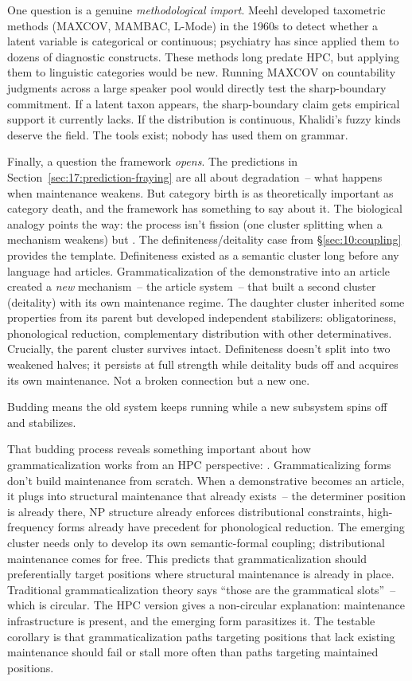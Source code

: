 One question is a genuine \emph{methodological import}. Meehl developed taxometric methods (MAXCOV, MAMBAC, L-Mode) in the 1960s to detect whether a latent variable is categorical or continuous; psychiatry has since applied them to dozens of diagnostic constructs. These methods long predate HPC, but applying them to linguistic categories would be new. Running MAXCOV on countability judgments across a large speaker pool would directly test the sharp-boundary commitment. If a latent taxon appears, the sharp-boundary claim gets empirical support it currently lacks. If the distribution is continuous, Khalidi's fuzzy kinds deserve the field. The tools exist; nobody has used them on grammar.

Finally, a question the framework \emph{opens}. The predictions in Section~\ref{sec:17:prediction-fraying} are all about degradation~-- what happens when maintenance weakens. But category birth is as theoretically important as category death, and the framework has something to say about it. The biological analogy points the way: the process isn't fission (one cluster splitting when a mechanism weakens) but . The definiteness/deitality case from §\ref{sec:10:coupling} provides the template. Definiteness existed as a semantic cluster long before any language had articles. Grammaticalization of the demonstrative into an article created a \emph{new} mechanism~-- the article system~-- that built a second cluster (deitality) with its own maintenance regime. The daughter cluster inherited some properties from its parent but developed independent stabilizers: obligatoriness, phonological reduction, complementary distribution with other determinatives. Crucially, the parent cluster survives intact. Definiteness doesn't split into two weakened halves; it persists at full strength while deitality buds off and acquires its own maintenance. Not a broken connection but a new one.

Budding means the old system keeps running while a new subsystem spins off and stabilizes.

That budding process reveals something important about how grammaticalization works from an HPC perspective: . Grammaticalizing forms don't build maintenance from scratch. When a demonstrative becomes an article, it plugs into structural maintenance that already exists~-- the determiner position is already there, NP structure already enforces distributional constraints, high-frequency forms already have precedent for phonological reduction. The emerging cluster needs only to develop its own semantic-formal coupling; distributional maintenance comes for free. This predicts that grammaticalization should preferentially target positions where structural maintenance is already in place. Traditional grammaticalization theory says \enquote{those are the grammatical slots}~-- which is circular. The HPC version gives a non-circular explanation: maintenance infrastructure is present, and the emerging form parasitizes it. The testable corollary is that grammaticalization paths targeting positions that lack existing maintenance should fail or stall more often than paths targeting maintained positions.

